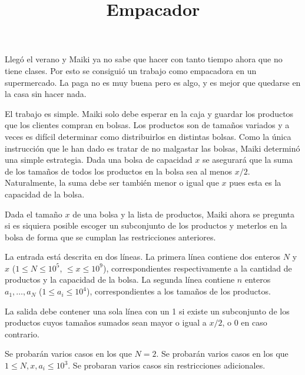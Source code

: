 \documentclass{oci}
\title{Empacador}
\begin{document}
\begin{problemDescription}
Llegó el verano y Maiki ya no sabe que hacer con tanto tiempo ahora que no tiene clases.
Por esto se consiguió un trabajo como empacadora en un supermercado.
La paga no es muy buena pero es algo, y es mejor que quedarse en la casa sin hacer nada.

El trabajo es simple.
Maiki solo debe esperar en la caja y guardar los productos que los clientes compran en bolsas.
Los productos son de tamaños variados y a veces es difícil determinar como distribuirlos
en distintas bolsas.
Como la única instrucción que le han dado es tratar de no malgastar las bolsas,
Maiki determinó una simple estrategia.
Dada una bolsa de capacidad $x$ se asegurará que la suma de los tamaños de todos los productos
en la bolsa sea al menos $x/2$.
Naturalmente, la suma debe ser también menor o igual que $x$ pues esta es la capacidad
de la bolsa.

Dada el tamaño $x$ de una bolsa y la lista de productos, Maiki ahora se pregunta si es siquiera
posible escoger un subconjunto de los productos y meterlos en la bolsa de forma que se cumplan
las restricciones anteriores.

\end{problemDescription}

\begin{inputDescription}
La entrada está descrita en dos líneas.
La primera línea contiene dos enteros $N$ y $x$ ($1\leq N\leq 10^5$, $\leq x \leq 10^9$),
correspondientes respectivamente a la cantidad de productos y la capacidad de la bolsa.
La segunda línea contiene $n$ enteros $a_1,\ldots, a_N$ ($1\leq a_i\leq 10^4$), correspondientes
a los tamaños de los productos.
\end{inputDescription}

\begin{outputDescription}
La salida debe contener una sola línea con un 1 si existe un subconjunto de los productos
cuyos tamaños sumados sean mayor o igual a $x/2$, o 0 en caso contrario.
\end{outputDescription}

\begin{scoreDescription}
  Se probarán varios casos en los que $N = 2$.
  Se probarán varios casos en los que $1 \leq N, x, a_i \leq 10^3$.
  Se probaran varios casos sin restricciones adicionales.
\end{scoreDescription}

\begin{sampleDescription}
\end{sampleDescription}
\end{document}
